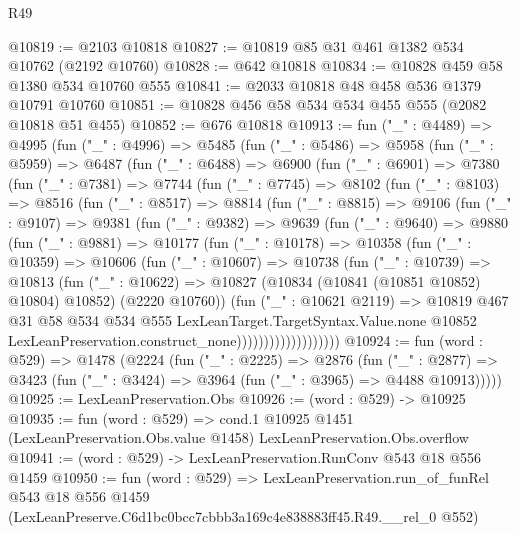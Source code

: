 \begin{lexlean}{R49}
\begin{coremodule}
@10819 := @2103 @10818
@10827 := @10819 @85 @31 @461 @1382 @534 @10762 (@2192 @10760)
@10828 := @642 @10818
@10834 := @10828 @459 @58 @1380 @534 @10760 @555
@10841 := @2033 @10818 @48 @458 @536 @1379 @10791 @10760
@10851 := @10828 @456 @58 @534 @534 @455 @555 (@2082 @10818 @51 @455)
@10852 := @676 @10818
@10913 := fun ("_" : @4489) =>
  @4995
    (fun ("_" : @4996) =>
    @5485
      (fun ("_" : @5486) =>
      @5958
        (fun ("_" : @5959) =>
        @6487
          (fun ("_" : @6488) =>
          @6900
            (fun ("_" : @6901) =>
            @7380
              (fun ("_" : @7381) =>
              @7744
                (fun ("_" : @7745) =>
                @8102
                  (fun ("_" : @8103) =>
                  @8516
                    (fun ("_" : @8517) =>
                    @8814
                      (fun ("_" : @8815) =>
                      @9106
                        (fun ("_" : @9107) =>
                        @9381
                          (fun ("_" : @9382) =>
                          @9639
                            (fun ("_" : @9640) =>
                            @9880
                              (fun ("_" : @9881) =>
                              @10177
                                (fun ("_" : @10178) =>
                                @10358
                                  (fun ("_" : @10359) =>
                                  @10606
                                    (fun ("_" : @10607) =>
                                    @10738
                                      (fun ("_" : @10739) =>
                                      @10813
                                        (fun ("_" : @10622) =>
                                        @10827
                                          (@10834 (@10841 (@10851 @10852) @10804) @10852)
                                          (@2220 @10760))
                                        (fun ("_" : @10621 @2119) =>
                                        @10819
                                          @467
                                          @31
                                          @58
                                          @534
                                          @534
                                          @555
                                          LexLeanTarget.TargetSyntax.Value.none
                                          @10852
                                          LexLeanPreservation.construct_none)))))))))))))))))))
@10924 := fun (word : @529) =>
  @1478
    (@2224
      (fun ("_" : @2225) =>
      @2876
        (fun ("_" : @2877) =>
        @3423 (fun ("_" : @3424) => @3964 (fun ("_" : @3965) => @4488 @10913)))))
@10925 := LexLeanPreservation.Obs
@10926 := (word : @529) -> @10925
@10935 := fun (word : @529) =>
  cond.{1} @10925 @1451 (LexLeanPreservation.Obs.value @1458) LexLeanPreservation.Obs.overflow
@10941 := (word : @529) -> LexLeanPreservation.RunConv @543 @18 @556 @1459
@10950 := fun (word : @529) =>
  LexLeanPreservation.run_of_funRel
    @543
    @18
    @556
    @1459
    (LexLeanPreserve.C6d1bc0bcc7cbbb3a169c4e838883ff45.R49.__rel_0 @552)
\end{coremodule}
\end{lexlean}

